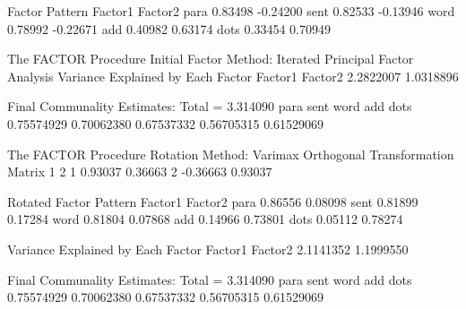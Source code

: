 \documentclass{article}
\begin{document}
\begin{Woutput}
           Factor Pattern
             Factor1         Factor2
para         0.83498        -0.24200
sent         0.82533        -0.13946
word         0.78992        -0.22671
add          0.40982         0.63174
dots         0.33454         0.70949

The FACTOR Procedure
Initial Factor Method: Iterated Principal Factor Analysis
Variance Explained by Each Factor
   Factor1         Factor2
 2.2822007       1.0318896

               Final Communality Estimates: Total = 3.314090
      para            sent            word             add            dots
0.75574929      0.70062380      0.67537332      0.56705315      0.61529069

The FACTOR Procedure
Rotation Method: Varimax
    Orthogonal Transformation Matrix
                       1               2
       1         0.93037         0.36663
       2        -0.36663         0.93037

       Rotated Factor Pattern
             Factor1         Factor2
para         0.86556         0.08098
sent         0.81899         0.17284
word         0.81804         0.07868
add          0.14966         0.73801
dots         0.05112         0.78274

Variance Explained by Each Factor
   Factor1         Factor2
 2.1141352       1.1999550

               Final Communality Estimates: Total = 3.314090
      para            sent            word             add            dots
0.75574929      0.70062380      0.67537332      0.56705315      0.61529069
\end{Woutput}
\end{document}
